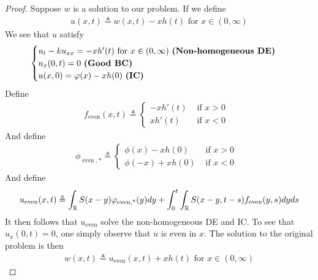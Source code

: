 \documentclass{report}
\begin{document}
\begin{proof}
Suppose $w$ is a solution to our problem. If we define 
\begin{align*}
u(x,t)\triangleq w(x,t)-xh(t)\text{ for }x\in (0,\infty)
\end{align*}
We see that $u$ satisfy 
\begin{align*}
\begin{cases}
  u_t-ku_{xx}=-xh'(t)\text{ for }x\in (0,\infty)\text{ \textbf{(Non-homogeneous DE)} }\\
  u_x(0,t)=0\text{ \textbf{(Good BC)} }\\
  u(x,0)=\phi (x)-xh(0)\text{ \textbf{(IC)} }
\end{cases}
\end{align*}
Define 
\begin{align*}
f_{\operatorname{even}}(x,t)\triangleq \begin{cases}
  -xh'(t)& \text{ if $x>0$ }\\
  xh'(t)& \text{ if $x<0$ }
\end{cases}
\end{align*}
And define 
\begin{align*}
\phi_{\operatorname{even},*}\triangleq \begin{cases}
  \phi (x)-xh(0)& \text{ if $x>0$ }\\
  \phi (-x)+xh(0)& \text{ if $x<0$ }
\end{cases}
\end{align*}
And define 
\begin{align*}
u_{\operatorname{even}}(x,t)\triangleq \int_{\R}S(x-y)\phi_{\operatorname{even,*}}(y)dy+\int_0^t \int_{\R}S(x-y,t-s)f_{\operatorname{even}}(y,s)dyds
\end{align*}
It then follows that $u_{\operatorname{even}}$ solve the non-homogeneous DE and IC. To see that $u_x(0,t)=0$, one simply observe that $u$ is even in  $x$. The solution to the original problem is then 
\begin{align*}
w(x,t)\triangleq u_{\operatorname{even}}(x,t)+xh(t)\text{ for }x\in (0,\infty)
\end{align*}
\end{proof}
\end{document}
